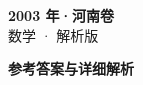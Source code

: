 \documentclass[zihao=-4, a4paper]{ctexart}
\begin{document}
\begin{center}
  {\Large\bfseries 2003 年·河南卷}\\[4pt]
  {\large 数学 · 解析版}
\end{center}
\medskip
{}

\clearpage
{}
\begin{center}{\Large\bfseries 参考答案与详细解析}\end{center}
\medskip

\end{document}
